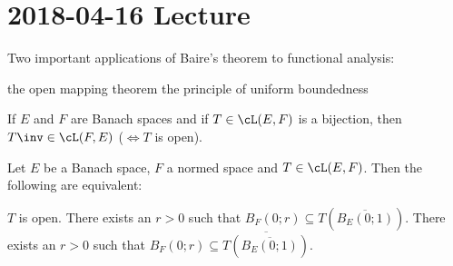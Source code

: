 \section{2018-04-16 Lecture}

Two important applications of Baire's theorem to functional analysis:
\begin{enum}
	\io the open mapping theorem
	\io the principle of uniform boundedness
\end{enum}

\begin{thm}
	If $E$ and $F$ are Banach spaces and if $T \in \cL(E,F)$ is a bijection, then $T\inv \in \cL(F,E)$ ($\iff T$ is open).
\end{thm}

\begin{prop}
	Let $E$ be a Banach space, $F$ a normed space and $T \in \cL(E,F)$.
	Then the following are equivalent:
	\begin{enum}
		\io $T$ is open.
		\io There exists an $r>0$ such that $B_F(0;r) \subseteq T(\overline{B_E(0;1)})$.
		\io There exists an $r>0$ such that $B_F(0;r) \subseteq \overline{T(\overline{B_E(0;1)})}$.
	\end{enum}
\end{prop}


